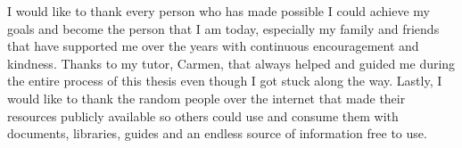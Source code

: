 I would like to thank every person who has made possible I could achieve my goals and become the person that I am today, especially my family and friends that have supported me over the years with continuous encouragement and kindness.
Thanks to my tutor, Carmen, that always helped and guided me during the entire process of this thesis even though I got stuck along the way.
Lastly, I would like to thank the random people over the internet that made their resources publicly available so others could use and consume them with documents, libraries, guides and an endless source of information free to use.